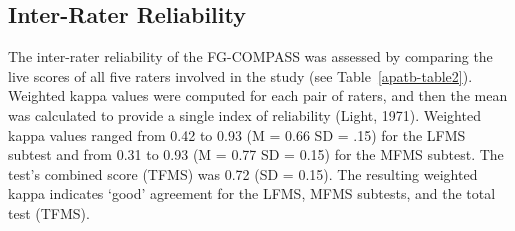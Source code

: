\documentclass[
  man,
  colorlinks=true,linkcolor=blue,citecolor=blue,urlcolor=blue]{apa7}
\begin{document}
\subsection{Inter-Rater Reliability}\label{inter-rater-reliability}

The inter-rater reliability of the FG-COMPASS was assessed by comparing
the live scores of all five raters involved in the study (see
Table~\ref{apatb-table2}). Weighted kappa values were computed for each
pair of raters, and then the mean was calculated to provide a single
index of reliability (Light, 1971). Weighted kappa values ranged from
0.42 to 0.93 (M = 0.66 SD = .15) for the LFMS subtest and from 0.31 to
0.93 (M = 0.77 SD = 0.15) for the MFMS subtest. The test's combined
score (TFMS) was 0.72 (SD = 0.15). The resulting weighted kappa
indicates `good' agreement for the LFMS, MFMS subtests, and the total
test (TFMS).
\end{document}
